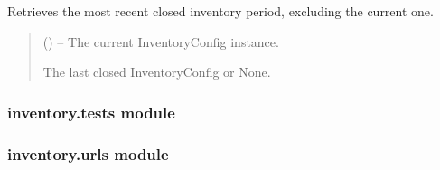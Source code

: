 \documentclass[a4paper,11pt,spanish]{sphinxmanual}
\begin{document}

\begin{fulllineitems}
\label{\detokenize{api/inventory/inventory.services:inventory.services.get_previous_period}}
\pysigstartsignatures
\pysiglinewithargsret
{}
{}
{}
\pysigstopsignatures
\sphinxAtStartPar
Retrieves the most recent closed inventory period, excluding the current one.
\begin{quote}\begin{description}
\sphinxAtStartPar
{} ({\hyperref[\detokenize{api/inventory/inventory.models:inventory.models.InventoryConfig}]{}}) – The current InventoryConfig instance.

\sphinxAtStartPar
The last closed InventoryConfig or None.

\end{description}\end{quote}

\end{fulllineitems}


\sphinxstepscope


\subsubsection{inventory.tests module}
\label{\detokenize{api/inventory/inventory.tests:module-inventory.tests}}\label{\detokenize{api/inventory/inventory.tests:inventory-tests-module}}\label{\detokenize{api/inventory/inventory.tests::doc}}
\sphinxstepscope


\subsubsection{inventory.urls module}
\label{\detokenize{api/inventory/inventory.urls:module-inventory.urls}}\label{\detokenize{api/inventory/inventory.urls:inventory-urls-module}}\label{\detokenize{api/inventory/inventory.urls::doc}}
\sphinxstepscope
\end{document}
